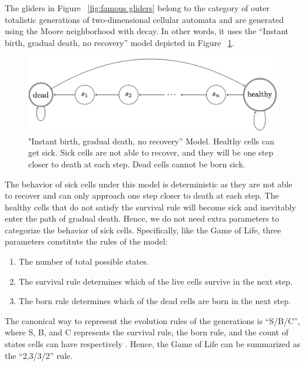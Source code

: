 \documentclass[12pt]{article}
\numberwithin{figure}{section} %
\begin{document}
The gliders in Figure ~\ref{fig:famous gliders} belong to the category of outer totalistic generations of two-dimensional cellular automata and are generated using the Moore neighborhood with decay. In other words, it uses the “Instant birth, gradual death, no recovery” model depicted in Figure ~\ref{fig:IGN model}. 

\begin{figure}[H]
	\centering
	\includegraphics[width=\linewidth]{Section1/9}
	\caption["Instant birth, gradual death, no recovery” Model]{"Instant birth, gradual death, no recovery” Model. Healthy cells can get sick. Sick cells are not able to recover, and they will be one step closer to death at each step. Dead cells cannot be born sick.}
	\label{fig:IGN model}
	\vspace{-1.5em}
\end{figure}

The behavior of sick cells under this model is deterministic as they are not able to recover and can only approach one step closer to death at each step. The healthy cells that do not satisfy the survival rule will become sick and inevitably enter the path of gradual death. Hence, we do not need extra parameters to categorize the behavior of sick cells. Specifically, like the Game of Life,  three parameters constitute the rules of the model: 
\begin{enumerate}[topsep=0pt,itemsep=-1ex,partopsep=1ex,parsep=1ex]
\item The number of total possible states. 
\item The survival rule determines which of the live cells survive in the next step. 
\item The born rule determines which of the dead cells are born in the next step. 
\end{enumerate}
The canonical way to represent the evolution rules of the generations is “S/B/C”, where S, B, and C represents the survival rule, the born rule, and the count of states cells can have respectively \cite{Lexicon}. Hence, the Game of Life can be summarized as the “2,3/3/2” rule.
\end{document}
